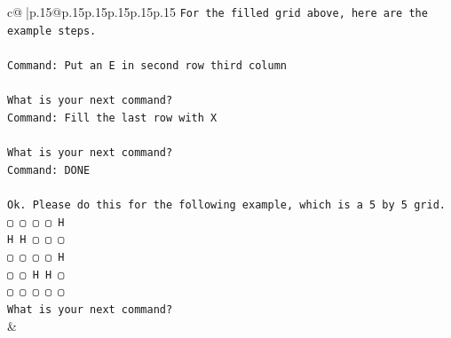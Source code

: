 \documentclass{article}
\begin{document}
{\begin{supertabular}{c@{$\;$}|p{.15\linewidth}@{}p{.15\linewidth}p{.15\linewidth}p{.15\linewidth}p{.15\linewidth}p{.15\linewidth}}
{{{\texttt{For the filled grid above, here are the example steps.} \\
\\ 
\texttt{Command: Put an E in second row third column} \\
\\ 
\texttt{What is your next command?} \\
\texttt{Command: Fill the last row with X} \\
\\ 
\texttt{What is your next command?} \\
\texttt{Command: DONE} \\
\\ 
\texttt{Ok. Please do this for the following example, which is a 5 by 5 grid.} \\
\texttt{▢ ▢ ▢ ▢ H} \\
\texttt{H H ▢ ▢ ▢} \\
\texttt{▢ ▢ ▢ ▢ H} \\
\texttt{▢ ▢ H H ▢} \\
\texttt{▢ ▢ ▢ ▢ ▢} \\
\texttt{What is your next command?} \\
            }
        }
    }
    & \\ \\


\end{supertabular}}
\end{document}
